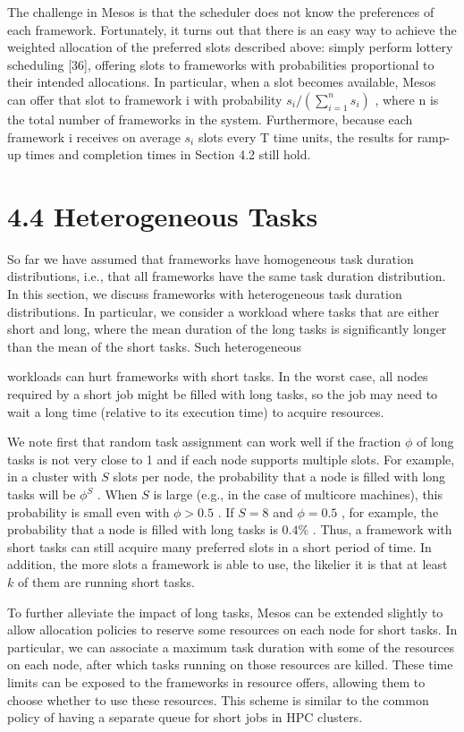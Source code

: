 \documentclass[
]{article}
\begin{document}
The challenge in Mesos is that the scheduler does not know the
preferences of each framework. Fortunately, it turns out that there is
an easy way to achieve the weighted allocation of the preferred slots
described above: simply perform lottery scheduling {[}36{]}, offering
slots to frameworks with probabilities proportional to their intended
allocations. In particular, when a slot becomes available, Mesos can
offer that slot to framework i with probability
\(s_{i}/(\sum_{i=1}^{n} s_{i})\) , where n is the total number of
frameworks in the system. Furthermore, because each framework i receives
on average \(s_{i}\) slots every T time units, the results for ramp-up
times and completion times in Section 4.2 still hold.

\section{4.4 Heterogeneous Tasks}\label{heterogeneous-tasks}

So far we have assumed that frameworks have homogeneous task duration
distributions, i.e., that all frameworks have the same task duration
distribution. In this section, we discuss frameworks with heterogeneous
task duration distributions. In particular, we consider a workload where
tasks that are either short and long, where the mean duration of the
long tasks is significantly longer than the mean of the short tasks.
Such heterogeneous

workloads can hurt frameworks with short tasks. In the worst case, all
nodes required by a short job might be filled with long tasks, so the
job may need to wait a long time (relative to its execution time) to
acquire resources.

We note first that random task assignment can work well if the fraction
\(\phi\) of long tasks is not very close to 1 and if each node supports
multiple slots. For example, in a cluster with \(S\) slots per node, the
probability that a node is filled with long tasks will be \(\phi^S\) .
When \(S\) is large (e.g., in the case of multicore machines), this
probability is small even with \(\phi > 0.5\) . If \(S = 8\) and
\(\phi = 0.5\) , for example, the probability that a node is filled with
long tasks is \(0.4\%\) . Thus, a framework with short tasks can still
acquire many preferred slots in a short period of time. In addition, the
more slots a framework is able to use, the likelier it is that at least
\(k\) of them are running short tasks.

To further alleviate the impact of long tasks, Mesos can be extended
slightly to allow allocation policies to reserve some resources on each
node for short tasks. In particular, we can associate a maximum task
duration with some of the resources on each node, after which tasks
running on those resources are killed. These time limits can be exposed
to the frameworks in resource offers, allowing them to choose whether to
use these resources. This scheme is similar to the common policy of
having a separate queue for short jobs in HPC clusters.
\end{document}
